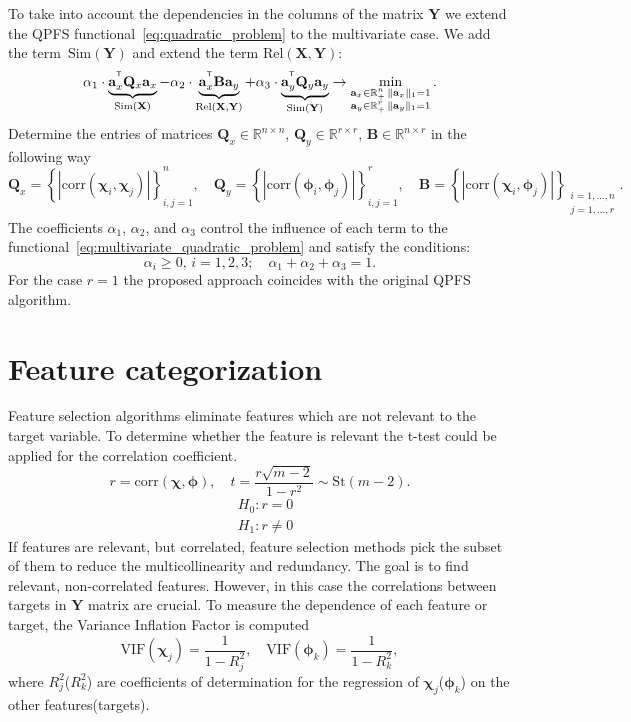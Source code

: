 \documentclass[12pt,twoside]{article}
\newcommand{\ba}{\mathbf{a}}
\newcommand{\bY}{\mathbf{Y}}
\newcommand{\bX}{\mathbf{X}}
\newcommand{\bB}{\mathbf{B}}
\newcommand{\bQ}{\mathbf{Q}}
\newcommand{\bbR}{\mathbb{R}}
\newcommand{\bchi}{\boldsymbol{\chi}}
\newcommand{\bphi}{\boldsymbol{\phi}}
\newcommand{\T}{^{\text{\tiny\sffamily\upshape\mdseries T}}}
\begin{document}
To take into account the dependencies in the columns of the matrix $\bY$ we extend the QPFS functional~\eqref{eq:quadratic_problem} to the multivariate case. We add the term~$\text{Sim}(\bY)$ and extend the term $\text{Rel}(\bX, \bY)$:
\begin{equation}
	\alpha_1 \cdot \underbrace{\ba_x^{\T} \bQ_x \ba_x}_{\text{Sim}(\bX)} - \alpha_2 \cdot \underbrace{\ba_x^{\T} \bB \ba_y}_{\text{Rel}(\bX, \bY)} + \alpha_3 \cdot \underbrace{\ba_y^{\T} \bQ_y \ba_y}_{\text{Sim}(\bY)} \rightarrow \min_{\substack{\ba_x \in \bbR^n_+ \, \|\ba_x\|_1=1 \\ \ba_y \in \bbR^r _+ \, \|\ba_y\|_1=1}}.
\end{equation}
Determine the entries of matrices $\bQ_x \in \bbR^{n \times n}$, $\bQ_y \in \bbR^{r \times r}$, $\bB \in \bbR^{n \times r}$ in the following way
\begin{equation}
	\bQ_x = \left\{ \left| \text{corr}(\bchi_i, \bchi_j) \right| \right\}_{i,j=1}^n, \quad 
	\bQ_y = \left\{ \left| \text{corr}(\bphi_i, \bphi_j) \right| \right\}_{i,j=1}^r, \quad
	\bB =  \left\{ \left| \text{corr}(\bchi_i, \bphi_j) \right| \right\}_{\substack{i=1, \dots, n \\ j=1, \dots, r}}.
	\label{eq:multivariate_quadratic_problem}
\end{equation}
The coefficients $\alpha_1$, $\alpha_2$, and $\alpha_3$ control the influence of each term to the functional~\eqref{eq:multivariate_quadratic_problem} and satisfy the conditions:
\[
	\alpha_i \geq 0, \, i = 1, 2, 3; \quad \alpha_1 + \alpha_2 + \alpha_3 = 1.
\]
For the case $r=1$ the proposed approach coincides with the original QPFS algorithm.

\section{Feature categorization}
Feature selection algorithms eliminate features which are not relevant to the target variable. 
To determine whether the feature is relevant the t-test could be applied for the correlation coefficient.
\[
	r = \text{corr} (\bchi, \bphi), \quad t = \frac{r \sqrt{m - 2}}{1 - r^2} \sim \text{St} (m - 2).
\]
\begin{align*}
&H_0: r = 0 \\
&H_1: r \neq 0
\end{align*}
If features are relevant, but correlated, feature selection methods pick the subset of them to reduce the multicollinearity and redundancy.
The goal is to find relevant, non-correlated features. 
However, in this case the correlations between targets in $\bY$ matrix are crucial.
To measure the dependence of each feature or target, the Variance Inflation Factor is computed
\[
	\text{VIF}(\bchi_j) = \frac{1}{1 - R_j^2}, \quad \text{VIF}(\bphi_k) = \frac{1}{1 - R_k^2},
\]
where $R_j^2$($R_k^2$) are coefficients of determination for the regression of $\bchi_j$($\bphi_k$) on the other features(targets).
\end{document}
